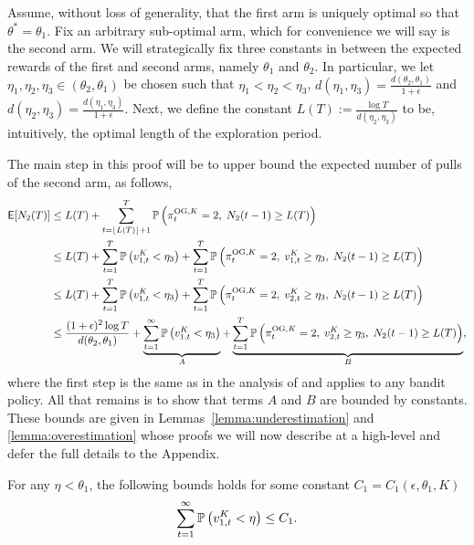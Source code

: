 \begin{myproof}[Proof.]	
	Assume, without loss of generality, that the first arm is uniquely optimal so that $\theta^* = \theta_1$. Fix an arbitrary sub-optimal arm, which for convenience we will say is the second arm. We will strategically fix three constants in between the expected rewards of the first and second arms, namely $\theta_1$ and $\theta_2$. In particular, we let $\eta_1,\eta_2,\eta_3 \in (\theta_2, \theta_1)$ be chosen such that $\eta_1 < \eta_2 < \eta_3$, $d(\eta_1, \eta_3) = \frac{d(\theta_2, \theta_1)}{1+\epsilon}$ and $d(\eta_2,\eta_3) =\frac{d(\eta_1, \eta_3)}{1+\epsilon} $. Next, we define the constant $L(T) := \frac{\log T}{d(\eta_2,\eta_3)}$ to be, intuitively, the optimal length of the exploration period.
	
	The main step in this proof will be to upper bound the expected number of pulls of the second arm, as follows,
	\begin{align}
	\E[N_2(T)] & \le L(T) + \sum_{t=\floor{L(T)}+1}^T \P{\pi^{{\rm OG},K}_t = 2, \; N_2(t-1) \ge L(T)} \nonumber \\
	& \le L(T) +   \sum_{t=1}^T \P{v^K_{1,t} < \eta_3} + \sum_{t=1}^T \P{\pi^{{\rm OG},K}_t = 2,\; v^K_{1,t} \ge \eta_3, \; N_2(t-1) \ge L(T)} \nonumber \\
	& \le L(T) +   \sum_{t=1}^T \P{v^K_{1,t} < \eta_3} + \sum_{t=1}^T \P{\pi^{{\rm OG},K}_t = 2,\; v^K_{2,t} \ge \eta_3, \; N_2(t-1) \ge L(T)} \nonumber \\
	& \le \frac{(1+\epsilon)^2 \log T}{d(\theta_2, \theta_1)} + \underbrace{\sum_{t=1}^\infty \P{v^K_{1,t} < \eta_3}}_{A} + \underbrace{\sum_{t=1}^T \P{\pi^{{\rm OG},K}_t = 2,\;v^K_{2,t} \ge \eta_3, \; N_2(t-1) \ge L(T)}}_{B}, \label{bound:final_step_in_freq_regret}
	\end{align}
	where the first step is the same as in the analysis of \cite{auer2002finite} and applies to any bandit policy. All that remains is to show that terms $A$ and $B$ are bounded by constants. These bounds are given in Lemmas~\ref{lemma:underestimation} and \ref{lemma:overestimation} whose proofs we will now describe at a high-level and defer the full details to the Appendix.
	\begin{lemma} \label{lemma:underestimation}
		For any $\eta < \theta_1$, the following bounds holds for some constant $C_1 = C_1(\epsilon, \theta_1, K)$
		\begin{equation*}
		\sum_{t=1}^\infty \P{v^K_{1,t} < \eta} \le C_1.
		\end{equation*}
	\end{lemma}

\end{myproof}
